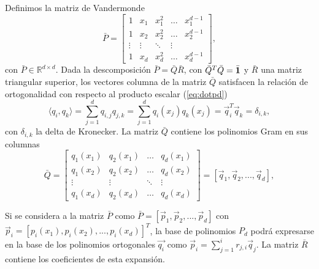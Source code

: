  Definimos la matriz de Vandermonde
 \begin{equation}
\bar{P}=
\begin{bmatrix}
    1  & x_{1} & x_{1}^2 & \dots  & x_{1}^{d-1} \\
    1  & x_{2} & x_{2}^2 & \dots  & x_{2}^{d-1} \\
    \vdots  & \vdots & \ddots & \vdots \\
    1 & x_{d} & x_{d}^2 & \dots  & x_{d}^{d-1}
\end{bmatrix},
\label{eq:Vandermonde}
\end{equation}
con $\bar{P}\in\mathbb{R}^{d \times d}$. 
Dada la descomposición $\bar{P}=\bar{Q}\bar{R}$, con $\bar{Q}^T\bar{Q}= \bar{\mathbf{1}}$ y $\bar{R}$ una matriz triangular superior, los vectores columna 
de la matriz $\bar{Q}$ satisfacen la relación de ortogonalidad con respecto al producto escalar 
(\ref{eq:dotpd}) 
\begin{equation*}
\displaystyle \langle q_i,q_k \rangle = \sum_{j=1}^{d}q_{i,j}q_{j,k}=\sum_{j=1}^{d}q_i(x_j)q_k(x_j)=\vec{q}_i^T\vec{q}_k=\delta_{i,k} ,
\end{equation*}
con $\delta_{i,k}$ la delta de 
Kronecker. 
La matriz $\bar{Q}$ contiene los polinomios Gram en sus columnas
\begin{equation}
\bar{Q}=
\begin{bmatrix}
    q_1(x_1) & q_2(x_1) & \dots  & q_{d}(x_1) \\
    q_1(x_2) & q_2(x_2) & \dots  & q_{d}(x_2) \\
    \vdots &  \vdots & \ddots & \vdots \\
    q_1(x_{d}) & q_2(x_{d}) & \dots  &q_{d}(x_{d})
\end{bmatrix}=[\vec{q}_1,\vec{q}_2,...,\vec{q}_{d}],
\label{eq:VandermondeQR}
\end{equation}

Si se considera a la matriz $\bar{P}$ como $\bar{P}=[\vec{p}_1,\vec{p}_2,...,\vec{p}_{d}]$ con $\vec{p}_i=[p_i(x_1),p_i(x_2),...,p_i(x_{d})]^T$, la base de polinomios $P_d$ podrá expresarse en la base de los polinomios ortogonales $\vec{q_i}$ como $\displaystyle \vec{p}_i=\sum_{j=1}^{i}r_{j,i}\vec{q}_j$. La matriz $\bar{R}$ contiene los coeficientes de esta expansión.

